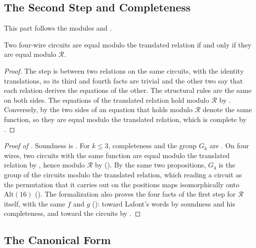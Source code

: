 \documentclass[acmsmall,screen,nonacm]{acmart}
\begin{document}
\subsection{The Second Step and Completeness}\label{app:xcxccx-second}

This part follows the modules  and .

\begin{proposition}\label{prop:x-second}
Two four-wire circuits are equal modulo the translated relation if and only if they are equal modulo $\mathcal{R}$.
\end{proposition}

\begin{proof}
The step is between two relations on the same circuits, with the identity translations, so its third and fourth facts are trivial and the other two say that each relation derives the equations of the other. The structural rules are the same on both sides. The equations of the translated relation hold modulo $\mathcal{R}$ by . Conversely, by  the two sides of an equation that holds modulo $\mathcal{R}$ denote the same function, so they are equal modulo the translated relation, which is complete by .
\end{proof}

\begin{proof}[Proof of ]
Soundness is . For $k\le3$, completeness and the group $G_k$ are . On four wires, two circuits with the same function are equal modulo the translated relation by , hence modulo $\mathcal{R}$ by  \textup{()}. By the same two propositions, $G_4$ is the group of the circuits modulo the translated relation, which reading a circuit as the permutation that it carries out on the positions maps isomorphically onto $\mathrm{Alt}(16)$ \textup{()}. The formalization also proves the four facts of the first step for $\mathcal{R}$ itself, with the same $f$ and $g$ \textup{()}: toward Lafont's words by soundness and his completeness, and toward the circuits by .
\end{proof}

\subsection{The Canonical Form}\label{app:xcxccx-nf}
\end{document}
